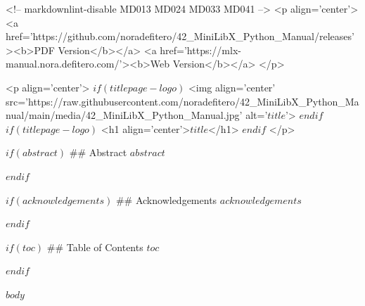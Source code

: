 <!-- markdownlint-disable MD013 MD024 MD033 MD041 -->
<p align='center'>
 <a href='https://github.com/noradefitero/42_MiniLibX_Python_Manual/releases'><b>PDF Version</b></a>
<a href='https://mlx-manual.nora.defitero.com/'><b>Web Version</b></a>
</p>

<p align='center'>
$if(titlepage-logo)$
<img align='center' src='https://raw.githubusercontent.com/noradefitero/42_MiniLibX_Python_Manual/main/media/42_MiniLibX_Python_Manual.jpg' alt='$title$'>
$endif$
$if(titlepage-logo)$
    <h1 align='center'>$title$</h1>
$endif$
</p>

$if(abstract)$
## Abstract
$abstract$

$endif$

$if(acknowledgements)$
## Acknowledgements
$acknowledgements$

$endif$

$if(toc)$
## Table of Contents
$toc$

$endif$

$body$
